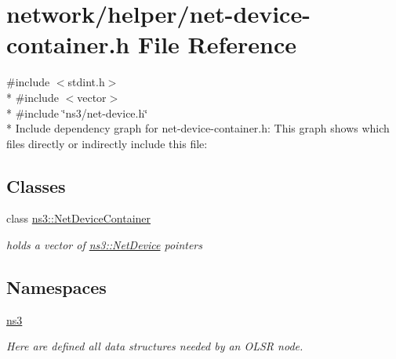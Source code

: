 \hypertarget{net-device-container_8h}{}\section{network/helper/net-\/device-\/container.h File Reference}
\label{net-device-container_8h}
{\ttfamily \#include $<$stdint.\+h$>$}\\*
{\ttfamily \#include $<$vector$>$}\\*
{\ttfamily \#include \char`\"{}ns3/net-\/device.\+h\char`\"{}}\\*
Include dependency graph for net-\/device-\/container.h\+:
This graph shows which files directly or indirectly include this file\+:
\subsection*{Classes}
\begin{DoxyCompactItemize}
\item 
class \hyperlink{classns3_1_1NetDeviceContainer}{ns3\+::\+Net\+Device\+Container}
\begin{DoxyCompactList}\small\item\em holds a vector of \hyperlink{classns3_1_1NetDevice}{ns3\+::\+Net\+Device} pointers \end{DoxyCompactList}\end{DoxyCompactItemize}
\subsection*{Namespaces}
\begin{DoxyCompactItemize}
\item 
 \hyperlink{namespacens3}{ns3}
\begin{DoxyCompactList}\small\item\em Here are defined all data structures needed by an O\+L\+SR node. \end{DoxyCompactList}\end{DoxyCompactItemize}
